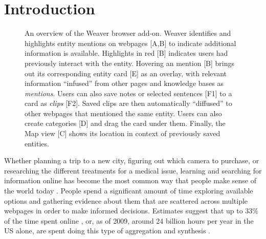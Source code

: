 \section{Introduction}


\begin{figure}
    \centering
    \caption[An overview of the Weaver browser add-on.]{An overview of the Weaver browser add-on. Weaver identifies and highlights entity mentions on webpages [A,B] to indicate additional information is available. Highlights in red [B] indicates users had previously interact with the entity. Hovering an mention [B] brings out its corresponding entity card [E] as an overlay, with relevant information ``infused'' from other pages and knowledge bases as \emph{mentions}. Users can also save notes or selected sentences [F1] to a card as \emph{clips} [F2]. Saved clips are then automatically ``diffused'' to other webpages that mentioned the same entity. Users can also create categories [D] and drag the card under them. Finally, the Map view [C] shows its location in context of previously saved entities.}
    \label{fig:main_fusion}
\end{figure}

Whether planning a trip to a new city, figuring out which camera to purchase, or researching the different treatments for a medical issue, learning and searching for information online has become the most common way that people make sense of the world today \cite{mar2006exp,pirolli1999information}. People spend a significant amount of time exploring available options and gathering evidence about them that are scattered across multiple webpages in order to make informed decisions.  Estimates suggest that up to 33\% of the time spent online \cite{mar2006exp,kellar2007field,rose2004understanding}, or, as of 2009, around 24 billion hours per year in the US alone, are spent doing this type of aggregation and synthesis \cite{forrester}. 


